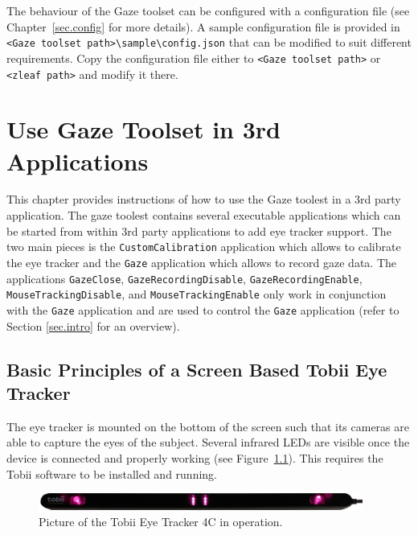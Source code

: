 \documentclass[a4paper,oneside]{book}
\begin{document}
The behaviour of the Gaze toolset can be configured with a configuration file (see Chapter~\ref{sec.config} for more details).
A sample configuration file is provided in \texttt{<Gaze toolset path>\textbackslash sample\textbackslash config.json} that can be modified to suit different requirements.
Copy the configuration file either to \texttt{<Gaze toolset path>} or \texttt{<zleaf path>} and modify it there.


\chapter{Use Gaze Toolset in 3rd Applications}
\label{sec.gazetomouse}
This chapter provides instructions of how to use the Gaze toolest in a 3rd party application.
The gaze toolest contains several executable applications which can be started from within 3rd party applications to add eye tracker support.
The two main pieces is the \texttt{CustomCalibration} application which allows to calibrate the eye tracker and the \texttt{Gaze} application which allows to record gaze data.
The applications \texttt{GazeClose}, \texttt{GazeRecordingDisable}, \texttt{GazeRecordingEnable}, \texttt{MouseTrackingDisable}, and \texttt{MouseTrackingEnable} only work in conjunction with the \texttt{Gaze} application and are used to control the \texttt{Gaze} application (refer to Section \ref{sec.intro} for an overview).

\section{Basic Principles of a Screen Based Tobii Eye Tracker}
\label{sec.eyetracker}
The eye tracker is mounted on the bottom of the screen such that its cameras are able to capture the eyes of the subject.
Several infrared LEDs are visible once the device is connected and properly working (see Figure~\ref{fig.eyetracker}).
This requires the Tobii software to be installed and running.
\begin{figure}[ht]
    \centering
    \includegraphics[width=0.95\textwidth]{eye_tracker.jpg}
    \caption{Picture of the Tobii Eye Tracker 4C in operation.}
    \label{fig.eyetracker}
\end{figure}
\end{document}

